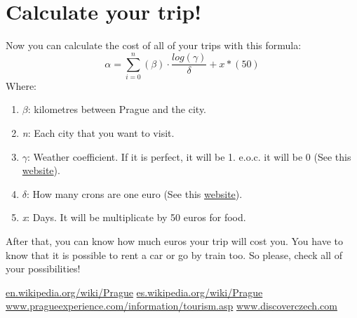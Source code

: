 \documentclass[a4paper, 12pt]{report}
\begin{document}
\section{Calculate your trip!}
	Now you can calculate the cost of all of your trips with this formula:
		\begin{equation}
			\alpha = \sum_{i=0}^{n} (\beta) \cdot \frac {log(\gamma )}{\delta}  + x * (50)
		\end{equation}
	Where:
	\begin{enumerate}
		\item  $\beta$: kilometres between Prague and the city.
		\item \emph{n}: Each city that you want to visit.
		\item $\gamma$: Weather coefficient. If it is perfect, it will be 1. e.o.c. it will be 0 (See this \href{http://www.weather.com/weather/tenday/Prague+Czech+Republic+EZXX0012}{website}).
		\item $\delta$: How many crons are one euro (See this \href{http://themoneyconverter.com/EUR/SEK.aspx}{website}).
		\item \emph{x}: Days. It will be multiplicate by 50 euros for food.
	\end{enumerate}

	After that, you can know how much euros your trip will cost you. You have to know that it is possible to rent a car or go by train too. So please, check all of your possibilities!
\newpage
\begin{thebibliography}{9}
	\href{http:\\en.wikipedia.org/wiki/Prague}{en.wikipedia.org/wiki/Prague}
	\href{http:\\es.wikipedia.org/wiki/Prague}{es.wikipedia.org/wiki/Prague}
	\href{http:\\www.pragueexperience.com/information/tourism.asp}{www.pragueexperience.com/information/tourism.asp}
	\href{http:\\www.discoverczech.com/apictures/z_hradeckralove/hradec-kralove/}{www.discoverczech.com}
\end{thebibliography}
\end{document}
